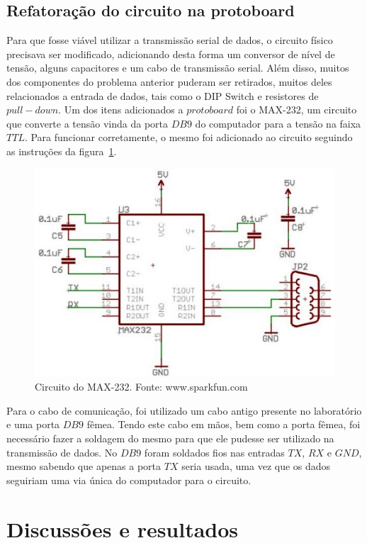 \documentclass[12pt]{article}
\begin{document}
\subsection{Refatoração do circuito na protoboard}

Para que fosse viável utilizar a transmissão serial de dados, o circuito físico precisava ser modificado, adicionando desta forma um conversor de nível de tensão, alguns capacitores e um cabo de transmissão serial. Além disso, muitos dos componentes do problema anterior puderam ser retirados, muitos deles relacionados a entrada de dados, tais como o DIP Switch e resistores de $pull-down$. Um dos itens adicionados a $protoboard$ foi o MAX-232, um circuito que converte a tensão vinda da porta $DB9$ do computador para a tensão na faixa $TTL$. Para funcionar corretamente, o mesmo foi adicionado ao circuito seguindo as instruções da figura~\ref{fig:max232}.

\begin{figure}[h]
\centering
\includegraphics[width=.8\textwidth]{img/232.jpg}
\caption{Circuito do MAX-232. Fonte: www.sparkfun.com}
\label{fig:max232}
\end{figure}

Para o cabo de comunicação, foi utilizado um cabo antigo presente no laboratório e uma porta $DB9$ fêmea. Tendo este cabo em mãos, bem como a porta fêmea, foi necessário fazer a soldagem do mesmo para que ele pudesse ser utilizado na transmissão de dados. No $DB9$ foram soldados fios nas entradas $TX$, $RX$ e $GND$, mesmo sabendo que apenas a porta $TX$ seria usada, uma vez que os dados seguiriam uma via única do computador para o circuito.

\section{Discussões e resultados}
\end{document}
